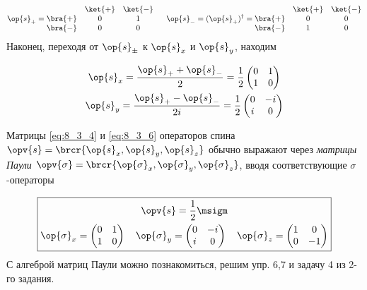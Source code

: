 \begin{equation}
\label{eq:8_3_5}
\op{s}_{+} = 
\begin{matrix}
            & \ket{+} & \ket{-} \\
\bra{+} &  0         & 1         \\
\bra{-}  &  0         & 0         
\end{matrix}
~~~~~\op{s}_{-} = (\op{s}_{+})^\dag = 
\begin{matrix}
            & \ket{+} & \ket{-} \\
\bra{+} &  0         & 0         \\
\bra{-}  &  1         & 0         
\end{matrix}
\end{equation}%
%
Наконец, переходя от $\op{s}_{\pm}$ к $\op{s}_x$ и $\op{s}_y$, находим

\begin{equation}
\label{eq:8_3_6}
\begin{gathered}
\op{s}_x = \frac{\op{s}_{+} + \op{s}_{-}}{2} = \frac{1}{2} \left (
  \begin{matrix}
  0 & 1 \\
  1 & 0 
  \end{matrix}
\right )
\\
\op{s}_y = \frac{\op{s}_{+} - \op{s}_{-}}{2i} = \frac{1}{2} \left (
  \begin{matrix}
  0 & -i \\
  i & 0 
  \end{matrix}
\right )
\end{gathered}
\end{equation}

Матрицы \eqref{eq:8_3_4} и \eqref{eq:8_3_6} операторов спина $\opv{s} = \brcr{\op{s}_x, \op{s}_y, \op{s}_z}$ обычно выражают через {\em матрицы Паули} $\opv{\sigma} = \brcr{\op{\sigma}_x, \op{\sigma}_y, \op{\sigma}_z}$, вводя соответствующие $\sigma$-операторы

$$
\boxed{
\begin{gathered}
  \opv{s}= \frac{1}{2}\msigm\\
  \op{\sigma}_x = \left (
    \begin{matrix}
    0 & 1 \\
    1 & 0 
    \end{matrix}
  \right )
  ~~~
  \op{\sigma}_y = \left (
    \begin{matrix}
    0 & -i \\
    i & 0 
    \end{matrix}
  \right )
  ~~~
  \op{\sigma}_z = \left (
    \begin{matrix}
    1 & 0 \\
    0 & -1 
    \end{matrix}
  \right)
\end{gathered}
}
$$%
%
С алгеброй матриц Паули можно познакомиться, решим упр. 6,7 и задачу 4 из 2-го задания.


